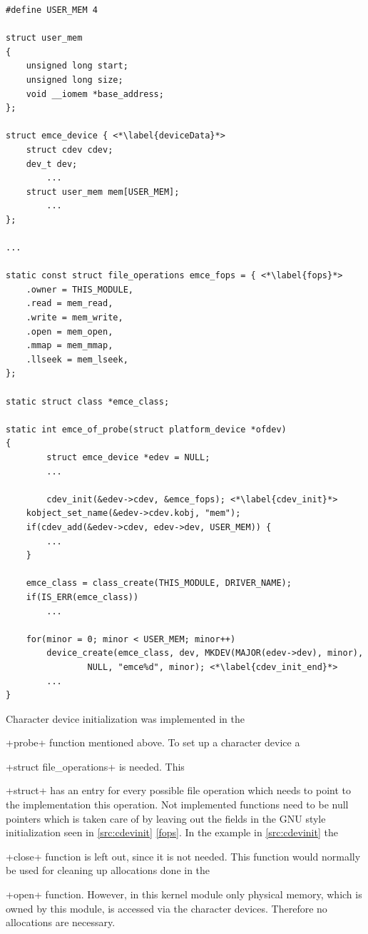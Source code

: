 \documentclass[12pt,a4paper,parskip=full,abstract=true,BCOR=12mm,twoside,open=right]{scrreprt}
\newcommand{\hack}{}
\newcommand*{\SavedLstInline}{}
\DeclareRobustCommand*{\lstinline}{%
  \ifmmode
    \let\SavedBGroup\bgroup
    \def\bgroup{%
      \let\bgroup\SavedBGroup
      \hbox\bgroup
    }%
  \fi
  \SavedLstInline
}
\begin{document}
\begin{lstlisting}[float=htbp,caption={Character device initialization},label=src:cdevinit,basicstyle=\hack\scriptsize]
#define USER_MEM 4

struct user_mem
{
	unsigned long start;
	unsigned long size;
	void __iomem *base_address;
};

struct emce_device { <*\label{deviceData}*>
	struct cdev cdev;
	dev_t dev;
        ...
	struct user_mem mem[USER_MEM];
        ...
};

...

static const struct file_operations emce_fops = { <*\label{fops}*>
	.owner = THIS_MODULE,
	.read = mem_read,
	.write = mem_write,
	.open = mem_open,
	.mmap = mem_mmap,
	.llseek = mem_lseek,
};

static struct class *emce_class;

static int emce_of_probe(struct platform_device *ofdev)
{
        struct emce_device *edev = NULL;
        ...

        cdev_init(&edev->cdev, &emce_fops); <*\label{cdev_init}*>
	kobject_set_name(&edev->cdev.kobj, "mem");
	if(cdev_add(&edev->cdev, edev->dev, USER_MEM)) {
		...
	}

	emce_class = class_create(THIS_MODULE, DRIVER_NAME);
	if(IS_ERR(emce_class))
		...

	for(minor = 0; minor < USER_MEM; minor++)
		device_create(emce_class, dev, MKDEV(MAJOR(edev->dev), minor),
				NULL, "emce%d", minor); <*\label{cdev_init_end}*>
        ...
}
\end{lstlisting}

Character device initialization was implemented in the \lstinline+probe+
function mentioned above. To set up a character device a
\lstinline+struct file_operations+\cite{ldd} is needed. This \lstinline+struct+
has an entry for every possible file operation which needs to point to the
implementation this operation. Not implemented functions need to be null pointers
which is taken care of by leaving out the fields
in the GNU style initialization seen in \cref{src:cdevinit} \cref{fops}. In
the example in \cref{src:cdevinit} the \lstinline+close+ function is left
out, since it is not needed. This function would normally be used for
cleaning up allocations done in the \lstinline+open+ function. However,
in this kernel module only physical memory, which is owned by this module,
is accessed via the character devices. Therefore no allocations are necessary.
\end{document}
